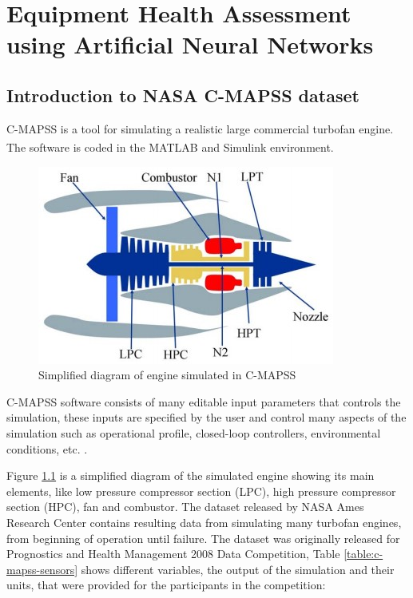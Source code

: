 \chapter{Equipment Health Assessment using Artificial Neural Networks}%
\label{chapter:equipment_health_assessment_using_artificial_neural_networks}


\section{Introduction to NASA C-MAPSS dataset}

C-MAPSS is a tool for simulating a realistic large commercial turbofan engine. The software is coded in the MATLAB\textsuperscript{\textregistered} and Simulink\textsuperscript{\textregistered} environment.

\begin{figure}
    \centering
    \includegraphics[width=.48\textwidth]{figures/c-mapss-engine-diagram.jpg}
    \caption{Simplified diagram of engine simulated in C-MAPSS \cite{Saxena2008}}
    \label{figure:c-mapss-engine-diagram}    
\end{figure}

C-MAPSS software consists of many editable input parameters that controls the simulation, these inputs are specified by the user and control many aspects of the simulation such as operational profile, closed-loop controllers, environmental conditions, etc. \cite{Saxena2008}. 

Figure \ref{figure:c-mapss-engine-diagram} is a simplified diagram of the simulated engine showing its main elements, like low pressure compressor section (LPC), high pressure compressor section (HPC), fan and combustor. The dataset released by NASA Ames Research Center contains resulting data from simulating many turbofan engines, from beginning of operation until failure. The dataset was originally released for Prognostics and Health Management 2008 Data Competition, Table \ref{table:c-mapss-sensors} shows different variables, the output of the simulation and their units, that were provided for the participants in the competition:

